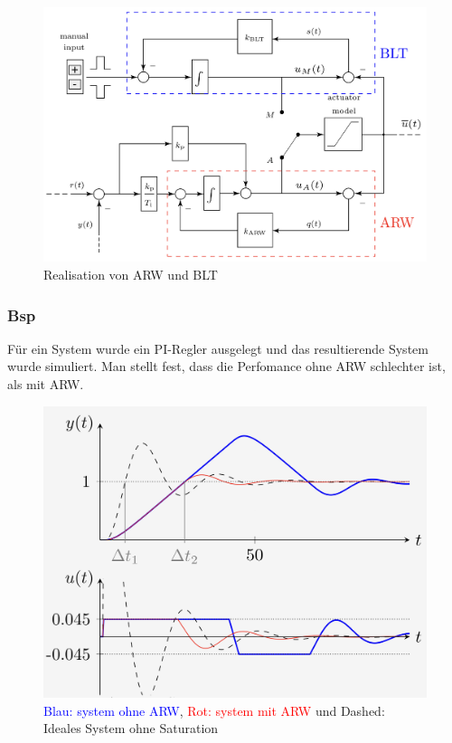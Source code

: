         \begin{figure}[H]
            \centering
            \includegraphics[width = 0.8\linewidth]{images/04/arw_bt.jpeg}
            \caption{Realisation von ARW und BLT}
        \end{figure}
        
    \subsubsection{Bsp}
        Für ein System wurde ein PI-Regler ausgelegt und das resultierende System wurde simuliert. Man stellt fest, dass die Perfomance ohne ARW schlechter ist, als mit ARW.
        
        \begin{figure}[H]
            \centering
            \includegraphics[width = 0.6\linewidth]{images/04/arw_bsp.jpeg}
            \caption{\textcolor{blue}{Blau: system ohne ARW}, \textcolor{red}{Rot: system mit ARW} und Dashed: Ideales System ohne Saturation}
        \end{figure}